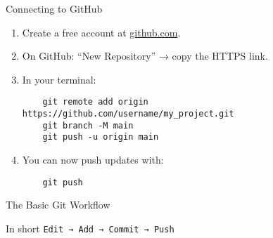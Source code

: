 \documentclass[aspectratio=169,13pt]{beamer}
\begin{document}
\begin{frame}[fragile]{Connecting to GitHub}
    \begin{enumerate}
        \item Create a free account at \href{https://github.com}{github.com}.
        \item On GitHub: “New Repository” → copy the HTTPS link.
        \item In your terminal:
              \begin{verbatim}
    git remote add origin https://github.com/username/my_project.git
    git branch -M main
    git push -u origin main
    \end{verbatim}
        \item You can now push updates with:
              \begin{verbatim}
    git push
    \end{verbatim}
    \end{enumerate}
\end{frame}

\begin{frame}{The Basic Git Workflow}
    \begin{center}
    \end{center}

    \vspace{1em}
    \begin{block}{In short}
        \texttt{Edit → Add → Commit → Push}
    \end{block}
\end{frame}
\end{document}
